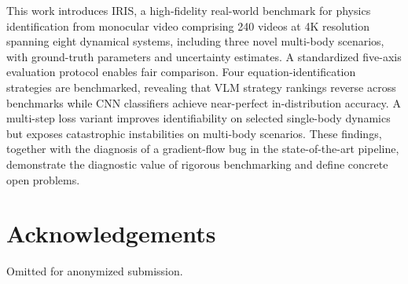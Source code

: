 \documentclass[runningheads]{llncs}
\begin{document}
This work introduces IRIS, a high-fidelity real-world benchmark for physics identification from monocular video comprising 240 videos at 4K resolution spanning eight dynamical systems, including three novel multi-body scenarios, with ground-truth parameters and uncertainty estimates. A standardized five-axis evaluation protocol enables fair comparison. Four equation-identification strategies are benchmarked, revealing that VLM strategy rankings reverse across benchmarks while CNN classifiers achieve near-perfect in-distribution accuracy. A multi-step loss variant improves identifiability on selected single-body dynamics but exposes catastrophic instabilities on multi-body scenarios. These findings, together with the diagnosis of a gradient-flow bug in the state-of-the-art pipeline, demonstrate the diagnostic value of rigorous benchmarking and define concrete open problems. 

\section*{Acknowledgements}
Omitted for anonymized submission.

{\sloppy\printbibliography}
\end{document}
